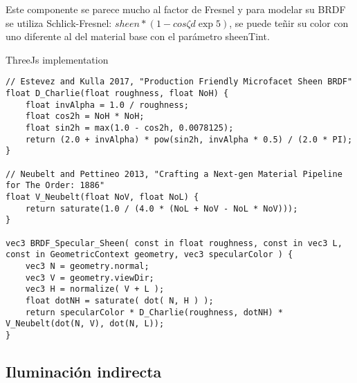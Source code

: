             Este componente se parece mucho al factor de Fresnel y para modelar su BRDF se
            utiliza Schlick-Fresnel: \(sheen * (1 − cos{\zeta}d\exp{5})\),  se puede te\~nir su
            color con uno diferente al del material base con el par\'ametro sheenTint.
            
            ThreeJs implementation
            \singlespacing
            \begin{lstlisting}[caption=My Javascript Example]
// Estevez and Kulla 2017, "Production Friendly Microfacet Sheen BRDF"
float D_Charlie(float roughness, float NoH) {
    float invAlpha = 1.0 / roughness;
    float cos2h = NoH * NoH;
    float sin2h = max(1.0 - cos2h, 0.0078125);
    return (2.0 + invAlpha) * pow(sin2h, invAlpha * 0.5) / (2.0 * PI);
}

// Neubelt and Pettineo 2013, "Crafting a Next-gen Material Pipeline for The Order: 1886"
float V_Neubelt(float NoV, float NoL) {
    return saturate(1.0 / (4.0 * (NoL + NoV - NoL * NoV)));
}

vec3 BRDF_Specular_Sheen( const in float roughness, const in vec3 L, const in GeometricContext geometry, vec3 specularColor ) {
    vec3 N = geometry.normal;
    vec3 V = geometry.viewDir;
    vec3 H = normalize( V + L );
    float dotNH = saturate( dot( N, H ) );
    return specularColor * D_Charlie(roughness, dotNH) * V_Neubelt(dot(N, V), dot(N, L));
}
            \end{lstlisting}
            \singlespacing


    \subsection{Iluminaci\'on indirecta}

\newpage
